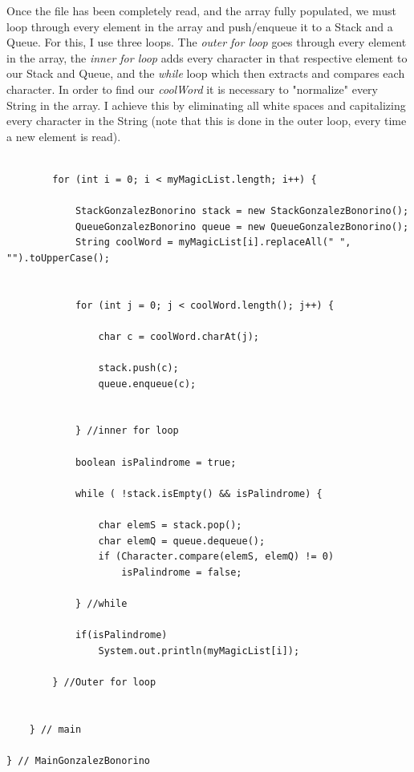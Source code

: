 \documentclass[letterpaper, 10pt]{article}
\begin{document}
Once the file has been completely read, and the array fully populated, we must loop through every element in the array and push/enqueue it to a Stack and a Queue. For this, I use three loops. The \textit{outer for loop} goes through every element in the array, the \textit{inner for loop} adds every character in that respective element to our Stack and Queue, and the \textit{while} loop which then extracts and compares each character. In order to find our \textit{coolWord} it is necessary to "normalize" every String in the array. I achieve this by eliminating all white spaces and capitalizing every character in the String (note that this is done in the outer loop, every time a new element is read).  

\begin{lstlisting}

		for (int i = 0; i < myMagicList.length; i++) {
			
			StackGonzalezBonorino stack = new StackGonzalezBonorino();
			QueueGonzalezBonorino queue = new QueueGonzalezBonorino();
			String coolWord = myMagicList[i].replaceAll(" ", "").toUpperCase();
			
			
			for (int j = 0; j < coolWord.length(); j++) {
				
				char c = coolWord.charAt(j);
				
				stack.push(c);
				queue.enqueue(c);
				
				
			} //inner for loop
			
			boolean isPalindrome = true;
			
			while ( !stack.isEmpty() && isPalindrome) {
				
				char elemS = stack.pop();
				char elemQ = queue.dequeue();
				if (Character.compare(elemS, elemQ) != 0)
					isPalindrome = false;
				
			} //while
				
			if(isPalindrome)
				System.out.println(myMagicList[i]);
			
		} //Outer for loop
		
		
	} // main

} // MainGonzalezBonorino
\end{lstlisting}
\end{document}
